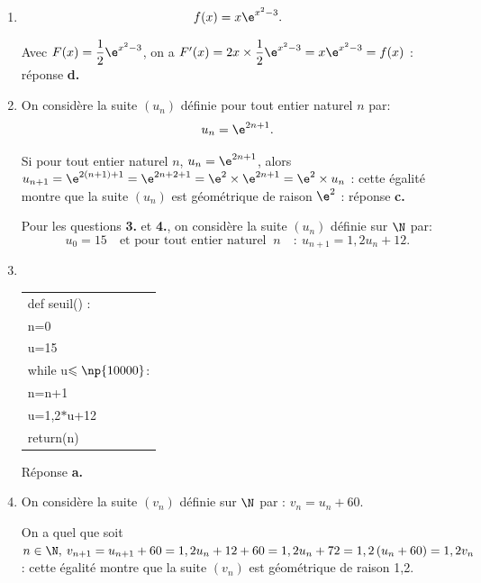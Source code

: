 \medskip








\begin{enumerate}
\item 
\[f(x) = x \e^{x^2 - 3}.\]








Avec $F(x) = \dfrac12 \e^{x^2 - 3}$, on a $F'(x) = 2x \times \dfrac12\e^{x^2 - 3} = x\e^{x^2 - 3} = f(x)$ : réponse \textbf{d.~}






\item On considère la suite $\left(u_n\right)$ définie pour tout entier naturel $n$ par: \[u_n = \e^{2n+1}.\]









Si pour tout entier naturel $n$, \: $u_n = \e^{2n+1}$, alors $u_{n+1} = \e^{2(n+1)+ 1} = \e^{2n + 2 + 1} = \e^{2} \times \e^{2n + 1} = \e^{2} \times u_n$ : cette égalité montre que la suite $\left(u_n\right)$ est géométrique de raison $\e^{2}$ : réponse \textbf{c.~~}

Pour les questions \textbf{3.} et \textbf{4.}, on considère la suite $\left(u_n\right)$ définie sur $\N$ par:
\[u_0 = 15 \quad \text{et pour tout entier naturel }\: n \quad :\: u_{n+1} = 1,2u_n + 12.\]

\item ~

\begin{center}
\begin{tabular}{|>{\ttfamily}l|}\hline
def seuil() :\\
\qquad n=0\\
\qquad u=15\\
\qquad while u$\leqslant \np{10000}$:\\
\qquad \quad n=n+1\\
\qquad \quad u=1,2$*$u+12\\
\qquad return(n)\\ \hline
\end{tabular}
\end{center}

Réponse \textbf{a.}








\item On considère la suite $\left(v_n\right)$ définie sur $\N$ par : $v_n = u_n + 60$. 









On a quel que soit $n \in \N, \: v_{n+1} = u_{n+1} + 60 =  1,2u_n + 12 + 60 = 1,2u_n + 72 = 1,2\left(u_n + 60\right) = 1,2v_n$ : cette égalité montre que la suite $\left(v_n\right)$ est géométrique de raison 1,2.
\end{enumerate}

\bigskip
